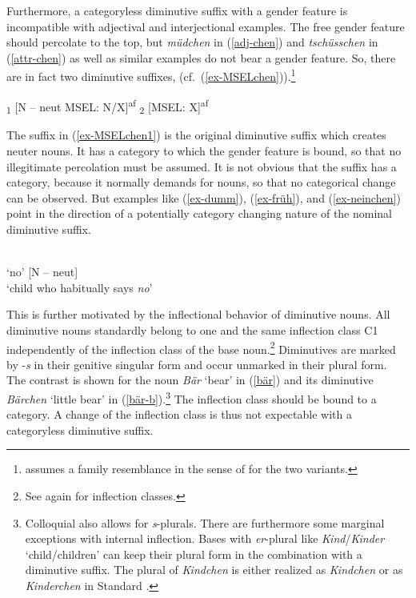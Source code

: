 \documentclass[output=paper
  ,nobabel
  ,draftmode
  ,colorlinks, citecolor=brown
]{langscibook}
\begin{document}
Furthermore, a categoryless diminutive suffix with a gender feature is incompatible with adjectival and interjectional examples. The free gender feature should percolate to the top, but \emph{müdchen} in (\ref{adj-chen}) and \emph{tschüsschen} in (\ref{attr-chen}) as well as similar examples do not bear a gender feature. So, there are in fact two diminutive suffixes, (cf.\ (\ref{ex-MSELchen})).\footnote{\citet{Wiese2006} assumes a family resemblance in the sense of \citet{Wittgenstein1953} for the two variants.}

\eal\label{ex-MSELchen}
\ex\label{ex-MSELchen1}
\textsubscript{1} {[N – neut {\textbar} MSEL: N/X]}\textsuperscript{af}
\ex\label{ex-MSELchen2}
\textsubscript{2} [MSEL: X]\textsuperscript{af}
\zl

\noindent The suffix in (\ref{ex-MSELchen1}) is the original diminutive suffix which creates neuter nouns. It has a category to which the gender feature is bound, so that no illegitimate percolation must be assumed. It is not obvious that the suffix has a category, because it normally demands for nouns, so that no categorical change can be observed. But examples like (\ref{ex-dumm}), (\ref{ex-früh}), and (\ref{ex-neinchen}) point in the direction of a potentially category changing nature of the nominal diminutive suffix.

\eal\label{ex-neinchen}
\ex {}\\ 
    `no' 
\ex {} [N – neut]\\
    `child who habitually says \emph{no}'
\zl

\noindent This is further motivated by the inflectional behavior of diminutive nouns. All diminutive nouns standardly belong to one and the same inflection class C1 independently of the inflection class of the base noun.\footnote{See again \citet[29]{IDS97} for inflection classes.} Diminutives are marked by -\emph{s} in their genitive singular form and occur unmarked in their plural form. The contrast is shown for the noun \emph{Bär} `bear' in (\ref{bär}) and its diminutive \emph{Bärchen} `little bear' in (\ref{bär-b}).\footnote{Colloquial  also allows for \emph{s}-plurals. There are furthermore some marginal exceptions with internal inflection. Bases with \emph{er}-plural like \emph{Kind}/\emph{Kinder} `child/children' can keep their plural form in the combination with a diminutive suffix. The plural of \emph{Kindchen} is either realized as \emph{Kindchen} or as \emph{Kinderchen} in Standard .} The inflection class should be bound to a category. A change of the inflection class is thus not expectable with a categoryless diminutive suffix.
\end{document}
